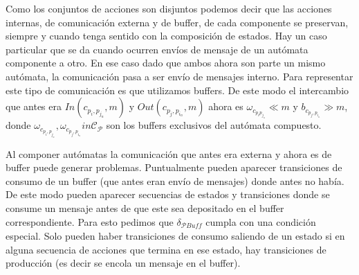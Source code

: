 Como los conjuntos de acciones son disjuntos podemos decir que las acciones internas, de comunicación externa y de buffer, de cada componente se preservan, siempre y cuando tenga sentido con la composición de estados. Hay un caso particular que se da cuando ocurren envíos de mensaje de un autómata componente a otro. En ese caso dado que ambos ahora son parte un mismo autómata, la comunicación pasa a ser envío de mensajes interno. Para representar este tipo de comunicación es que utilizamos buffers. De este modo el intercambio que antes era $\mathit{In} (c_{p_i, p_{j_n}},m)$ y $\mathit{Out}(c_{p_j, p_{i_n}},m)$ ahora es $\omega_{c_{p_i p_{j_n}}}  \ll m$ y $b_{c_{p_j, p_{i_n}}}  \gg  m$, donde $ \omega_{c_{p_i, p_{j_n}}}, \omega_{c_{p_j, p_{i_n}}} in \mathcal{C}_{\mathcal{P}} $ son los buffers exclusivos del autómata compuesto. 

Al componer autómatas la comunicación que antes era externa y ahora es de buffer puede generar problemas. Puntualmente pueden aparecer transiciones de consumo de un buffer (que antes eran envío de mensajes) donde antes no había. De este modo pueden aparecer secuencias de estados y transiciones donde se consume un mensaje antes de que este sea depositado en el buffer correspondiente. Para esto pedimos que $\delta_\mathit{\mathcal{P}Buff}$ cumpla con una condición especial. Solo pueden haber transiciones de consumo saliendo de un estado si en alguna secuencia de acciones que termina en ese estado, hay transiciones de producción (es decir se encola un mensaje en el buffer).

